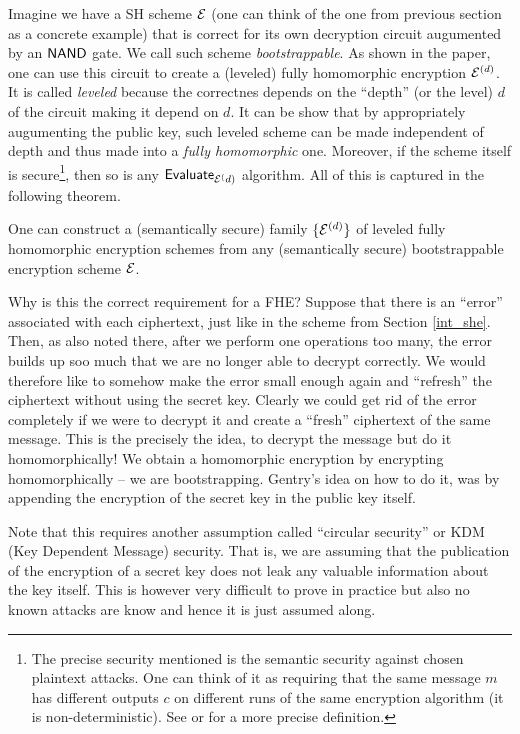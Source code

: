 Imagine we have a SH scheme $\mathcal{E}$ (one can think of the one from previous section as a concrete example) that is correct for its own decryption circuit augumented by an $\textsf{NAND}$ gate. We call such scheme \textit{bootstrappable}. As shown in the paper, one can use this circuit to create a (leveled) fully homomorphic encryption $\mathcal{E}^{(d)}$. It is called \textit{leveled} because the correctnes depends on the ``depth'' (or the level) $d$ of the circuit making it depend on $d$. It can be show that by appropriately augumenting the public key, such leveled scheme can be made independent of depth and thus made into a \textit{fully homomorphic} one. Moreover, if the scheme itself is secure\footnote{The precise security mentioned is the semantic security against chosen plaintext attacks. One can think of it as requiring that the same message $m$ has different outputs $c$ on different runs of the same encryption algorithm (it is non-deterministic). See \cite{katz} or \cite{lattice-survey} for a more precise definition.}, then so is any $\textsf{Evaluate}_{\mathcal{E}^(d)}$ algorithm. All of this is captured in the following theorem.

\begin{theorem}\label{boot}
  One can construct a (semantically secure) family $\{ \mathcal{E}^{(d)} \}$ of leveled fully homomorphic encryption schemes from any (semantically secure) bootstrappable encryption scheme $\mathcal{E}$.
\end{theorem}

Why is this the correct requirement for a FHE? Suppose that there is an ``error'' associated with each ciphertext, just like in the scheme from Section \ref{int_she}. Then, as also noted there, after we perform one operations too many, the error builds up soo much that we are no longer able to decrypt correctly. We would therefore like to somehow make the error small enough again and ``refresh'' the ciphertext without using the secret key. Clearly we could get rid of the error completely if we were to decrypt it and create a ``fresh'' ciphertext of the same message. This is the precisely the idea, to decrypt the message but do it homomorphically! We obtain a homomorphic encryption by encrypting homomorphically -- we are bootstrapping. Gentry's idea on how to do it, was by appending the encryption of the secret key in the public key itself.

\begin{remark}
Note that this requires another assumption called ``circular security'' or KDM (Key Dependent Message) security. That is, we are assuming that the publication of the encryption of a secret key does not leak any valuable information about the key itself. This is however very difficult to prove in practice but also no known attacks are know and hence it is just assumed along.
\end{remark}

